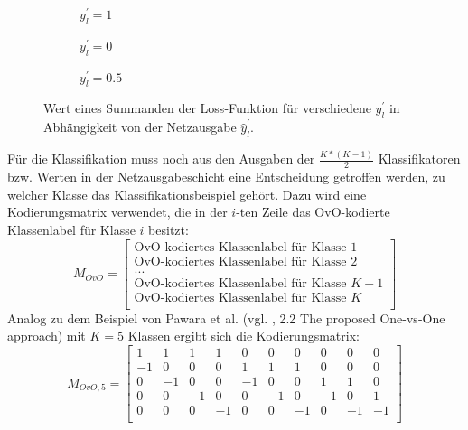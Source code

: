 \begin{figure}[H]
\centering
\begin{subfigure}{.3\textwidth}
\begin{adjustbox}{width=\textwidth, center}

\end{adjustbox}
\caption{$y_l^{'}=1$}
\label{fig:OvOLoss-y1}
\end{subfigure}
\begin{subfigure}{.3\textwidth}
\begin{adjustbox}{width=\textwidth, center}

\end{adjustbox}
\caption{$y_l^{'}=0$}
\label{fig:OvOLoss-y0}
\end{subfigure}
\begin{subfigure}{.3\textwidth}
\begin{adjustbox}{width=\textwidth, center}

\end{adjustbox}
\caption{$y_l^{'}=0.5$}
\label{fig:OvOLoss-y05}
\end{subfigure}
\caption{Wert eines Summanden der Loss-Funktion für verschiedene $y_l^{'}$ in Abhängigkeit von der Netzausgabe $\widehat{y}_l^{'}$.}
\label{fig:OvOLoss}
\end{figure}
Für die Klassifikation muss noch aus den Ausgaben der $\frac{K*(K-1)}{2}$ Klassifikatoren bzw. Werten in der Netzausgabeschicht eine Entscheidung getroffen werden, zu welcher Klasse das Klassifikationsbeispiel gehört.
Dazu wird eine Kodierungsmatrix verwendet, die in der $i$-ten Zeile das OvO-kodierte Klassenlabel für Klasse $i$ besitzt:\\
\[M_{OvO}=
\begin{bmatrix}
\text{OvO-kodiertes Klassenlabel für Klasse } 1 \\ 
\text{OvO-kodiertes Klassenlabel für Klasse } 2 \\ 
... \\
\text{OvO-kodiertes Klassenlabel für Klasse } K-1 \\ 
\text{OvO-kodiertes Klassenlabel für Klasse } K \\ 
\end{bmatrix} 
\]
\newpage
Analog zu dem Beispiel von Pawara et al. (vgl. \cite{pawaraPaper}, 2.2 The proposed One-vs-One approach) mit $K=5$ Klassen ergibt sich die Kodierungsmatrix:
\[M_{OvO,5}=
\begin{bmatrix}
1 & 1 & 1 & 1 & 0 & 0 & 0 & 0 & 0 & 0\\
-1 & 0 & 0 & 0 & 1 & 1 & 1 & 0 & 0 & 0\\
0 & -1 & 0 & 0 & -1 & 0 & 0 & 1 & 1 & 0\\
0 & 0 & -1 & 0 & 0 & -1 & 0 & -1 & 0 & 1\\
0 & 0 & 0 & -1 & 0 & 0 & -1 & 0 & -1 & -1\\
\end{bmatrix} 
\]
